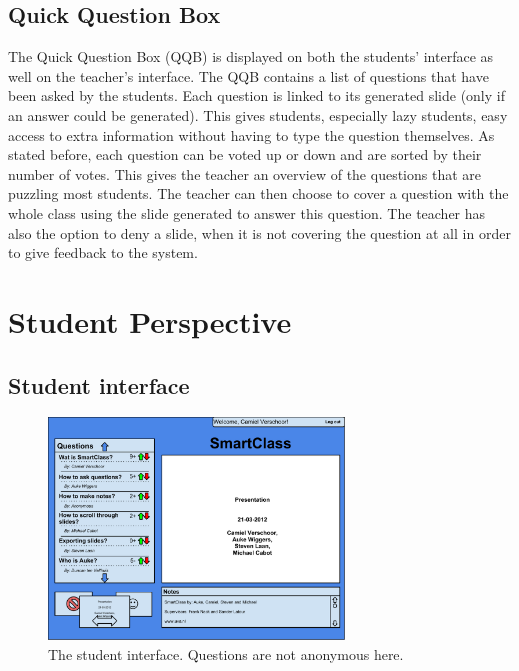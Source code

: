 \documentclass[11pt]{article}
\begin{document}
\subsection{Quick Question Box}
The Quick Question Box (QQB) is displayed on both the students' interface as well on the teacher's interface. The QQB contains a list of questions that have been asked by the students. Each question is linked to its generated slide (only if an answer could be generated). This gives students, especially lazy students, easy access to extra information without having to type the question themselves. As stated before, each question can be voted up or down and are sorted by their number of votes. This gives the teacher an overview of the questions that are puzzling most students. The teacher can then choose to cover a question with the whole class using the slide generated to answer this question. The teacher has also the option to deny a slide, when it is not covering the question at all in order to give feedback to the system.


\section{Student Perspective}
\subsection{Student interface}

\begin{figure}[!h]
\centering
\includegraphics[width=0.7\textwidth]{studentInterface.pdf}
\caption{The student interface. Questions are not anonymous here.}
\label{studentInterface}
\end{figure}
\end{document}
